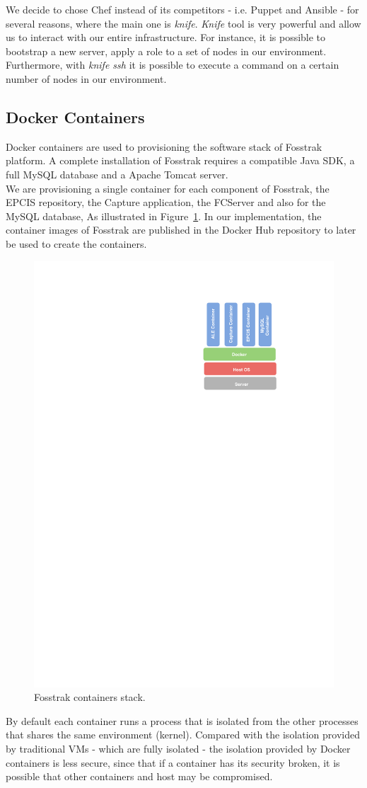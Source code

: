 We decide to chose Chef instead of its competitors - i.e. Puppet and Ansible - for several
reasons, where the main one is \textit{knife}. \textit{Knife} tool is very powerful and allow us to
interact with our entire infrastructure. For instance, it is possible to bootstrap a new server,
apply a role to a set of nodes in our environment. Furthermore, with \textit{knife ssh} it is
possible to execute a command on a certain number of nodes in our environment.\\

\subsection{Docker Containers}
\label{sub:impl_docker}
Docker containers are used to provisioning the software stack of Fosstrak platform. A complete
installation of Fosstrak requires a compatible Java \gls{SDK}, a full MySQL database and a Apache Tomcat
server.\\

We are provisioning a single container for each component of Fosstrak, the \gls{EPCIS} repository,
the Capture application, the \gls{FCServer} and also for the MySQL database, As illustrated in Figure~\ref{fig:impl_containers}.
In our implementation, the container images of Fosstrak are published in the Docker Hub repository
to later be used to create the containers.\\

\begin{figure}[!ht]
  \centering
  \includegraphics[width=.3\textwidth]{./images/docker-stack}
  \caption[Fosstrak containers stack.]{Fosstrak containers stack.}
  \label{fig:impl_containers}
\end{figure}

By default each container runs a process that is isolated from the other processes that shares the same
environment (kernel). Compared with the isolation provided by traditional \glspl{VM} - which are fully
isolated - the isolation provided by Docker containers is less secure, since that if a container has
its security broken, it is possible that other containers and host may be compromised.\\

